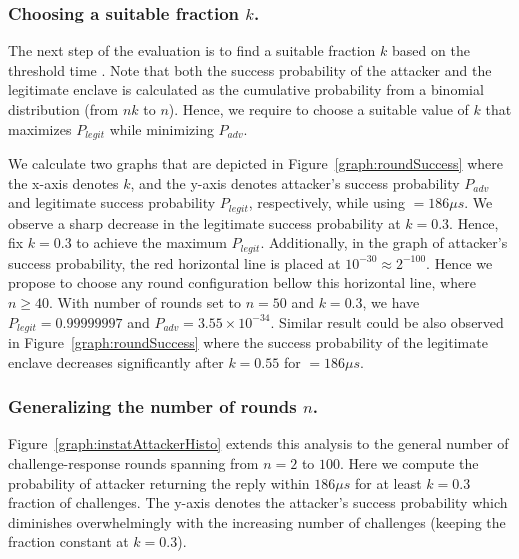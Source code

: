 \subsubsection{Choosing a suitable fraction $k$.} The next step of the evaluation is to find a suitable fraction $k$ based on the threshold time \connect. Note that both the success probability of the attacker and the legitimate enclave is calculated as the cumulative probability from a binomial distribution (from $nk$ to $n$). Hence, we require to choose a suitable value of $k$ that maximizes $P_{legit}$ while minimizing $P_{adv}$.

We calculate two graphs that are depicted in Figure~\ref{graph:roundSuccess} where the x-axis denotes $k$, and the y-axis denotes attacker's success probability $P_{adv}$ and legitimate success probability $P_{legit}$, respectively, while using \connect$=186 \mu s$. We observe a sharp decrease in the legitimate success probability at $k=0.3$. Hence, fix $k=0.3$ to achieve the maximum $P_{legit}$. Additionally, in the graph of attacker's success probability, the red horizontal line is placed at $10^{-30} \approx 2^{-100}$. Hence we propose to choose any round configuration bellow this horizontal line, where $n \geq 40$. With number of rounds set to $n=50$ and $k=0.3$, we have $P_{legit}=0.99999997$ and $P_{adv}=3.55\times 10^{-34}$. Similar result could be also observed in Figure~\ref{graph:roundSuccess} where the success probability of the legitimate enclave decreases significantly after $k=0.55$ for \connect$=186\mu s$.



\subsubsection{Generalizing the number of rounds $n$.} Figure~\ref{graph:instatAttackerHisto} extends this analysis to the general number of challenge-response rounds spanning from $n=2$ to $100$. Here we compute the probability of attacker returning the reply within $186 \mu s$ for at least $k=0.3$ fraction of challenges. The y-axis denotes the attacker's success probability which diminishes overwhelmingly with the increasing number of challenges (keeping the fraction constant at $k=0.3$). 



